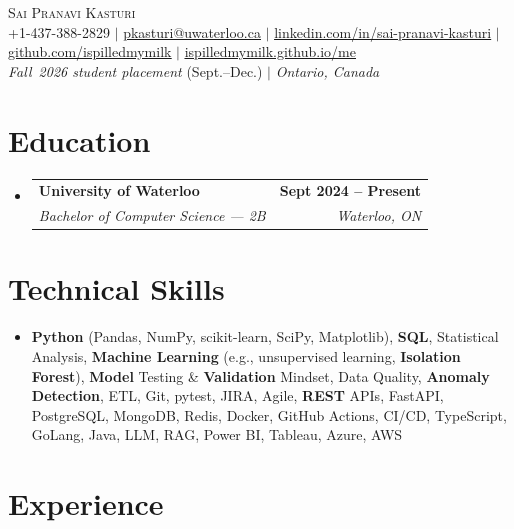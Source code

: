 \documentclass[letterpaper,10pt]{article}
\makeatletter
\newcommand{\resumeSubheading}[4]{
  \vspace{-1pt}\item
    \begin{tabular*}{1.0\textwidth}[t]{l@{\extracolsep{\fill}}r}
      \textbf{#1} & \textbf{\small #2} \\
      \textit{\small#3} & \textit{\small #4} \\[-2pt]
    \end{tabular*}\vspace{-7pt}
}
\newcommand{\resumeSubHeadingListStart}{\begin{itemize}[leftmargin=0.0in, label={}]}
\newcommand{\resumeSubHeadingListEnd}{\end{itemize}}
\makeatother
\begin{document}

\vspace{-28pt}
\begin{center}
    {\Huge \scshape Sai Pranavi Kasturi} \\
    \small +1-437-388-2829 $|$ \underline{pkasturi@uwaterloo.ca} $|$
    \href{https://linkedin.com/in/sai-pranavi-kasturi-704807298}{\underline{linkedin.com/in/sai-pranavi-kasturi}} $|$
    \href{https://github.com/ispilledmymilk}{\underline{github.com/ispilledmymilk}} $|$
    \href{https://ispilledmymilk.github.io/me/}{\underline{ispilledmymilk.github.io/me}} \\
    \vspace{2pt}
    \small \textit{Fall~2026 student placement} (Sept.--Dec.) $|$ \textit{Ontario, Canada}
    \vspace{-10pt}
\end{center}

\vspace{-10pt}
\section{Education}
  \resumeSubHeadingListStart
    \resumeSubheading
      {University of Waterloo}{Sept 2024 -- Present}
      {Bachelor of Computer Science --- 2B}{Waterloo, ON}
  \resumeSubHeadingListEnd
\vspace{-8pt}

\section{Technical Skills}
\begin{itemize}[leftmargin=0.05in, label={}]
  \small\item{
    \textbf{Python} (Pandas, NumPy, scikit-learn, SciPy, Matplotlib), \textbf{SQL}, Statistical Analysis, \textbf{Machine Learning} (e.g., unsupervised learning, \textbf{Isolation Forest}), \textbf{Model} Testing \& \textbf{Validation} Mindset, Data Quality, \textbf{Anomaly Detection}, ETL, Git, pytest, JIRA, Agile, \textbf{REST} APIs, FastAPI, PostgreSQL, MongoDB, Redis, Docker, GitHub Actions, CI/CD, TypeScript, GoLang, Java, LLM, RAG, Power BI, Tableau, Azure, AWS
  }
\end{itemize}
\vspace{-18pt}

\vspace{1.20pt}
\section{Experience}
\end{document}
